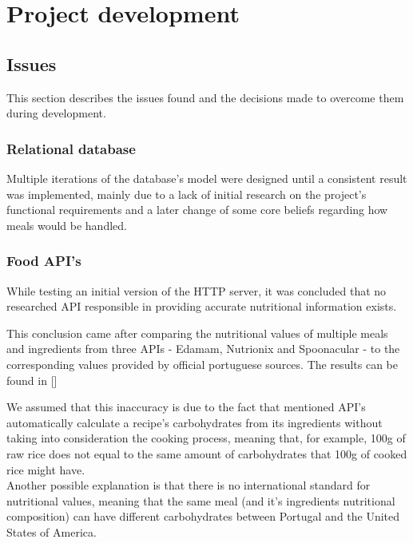 %
%
\chapter{Project development}

    \section{Issues}

    This section describes the issues found and the decisions made
    to overcome them during development.
    
    \subsection{Relational database}

    Multiple iterations of the database's model were designed until a consistent result was implemented,
    mainly due to a lack of initial research on the project's functional requirements and a later change
    of some core beliefs regarding how meals would be handled.\\

    \subsection{Food API's}

    While testing an initial version of the HTTP server,
    it was concluded that no researched API responsible in
    providing accurate nutritional information exists.

    This conclusion came after comparing the nutritional values of multiple
    meals and ingredients from three APIs - Edamam, Nutrionix and Spoonacular -
    to the corresponding values provided by official portuguese sources. 
    The results can be found in []

    We assumed that this inaccuracy is due to the fact that
    mentioned API's automatically calculate a recipe's carbohydrates
    from its ingredients without taking into consideration the cooking process, meaning that, for example,  
    100g of raw rice does not equal to the same amount of carbohydrates that 100g of 
    cooked rice might have.\\

    Another possible explanation is that there is no international standard for nutritional values,
    meaning that the same meal (and it's ingredients nutritional composition) 
    can have different carbohydrates between Portugal and the United States of America.\\
    

